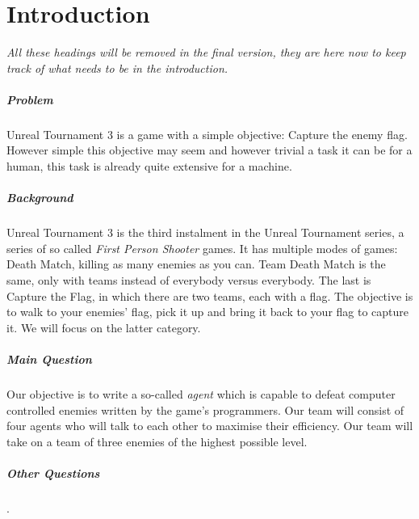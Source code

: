 \chapter*{Introduction}
\emph{All these headings will be removed in the final version, they are here now to keep track of what needs to be in the introduction.}
\paragraph{Problem}
Unreal Tournament 3 is a game with a simple objective: Capture the enemy flag. However simple this objective may seem and however trivial a task it can be for a human, this task is already quite extensive for a machine.
\paragraph{Background}
Unreal Tournament 3 is the third instalment in the Unreal Tournament series, a series of so called \emph{First Person Shooter} games. It has multiple modes of games: Death Match, killing as many enemies as you can. Team Death Match is the same, only with teams instead of everybody versus everybody. The last is Capture the Flag, in which there are two teams, each with a flag. The objective is to walk to your enemies' flag, pick it up and bring it back to your flag to capture it. We will focus on the latter category.
\paragraph{Main Question}
Our objective is to write a so-called \emph{agent} which is capable to defeat computer controlled enemies written by the game's programmers. Our team will consist of four agents who will talk to each other to maximise their efficiency. Our team will take on a team of three enemies of the highest possible level.
\paragraph{Other Questions}
.

